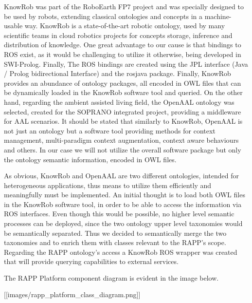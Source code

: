 Know\-Rob was part of the Robo\-Earth F\-P7 project and was specially designed to be used by robots, extending classical ontologies and concepts in a machine-\/usable way. Know\-Rob is a state-\/of-\/the-\/art robotic ontology, used by many scientific teams in cloud robotics projects for concepts storage, inference and distribution of knowledge. One great advantage to our cause is that bindings to R\-O\-S exist, as it would be challenging to utilize it otherwise, being developed in S\-W\-I-\/\-Prolog. Finally, The R\-O\-S bindings are created using the J\-P\-L interface (Java / Prolog bidirectional Interface) and the rosjava package. Finally, Know\-Rob provides an abundance of ontology packages, all encoded in O\-W\-L files that can be dynamically loaded in the Know\-Rob software tool and queried. On the other hand, regarding the ambient assisted living field, the Open\-A\-A\-L ontology was selected, created for the S\-O\-P\-R\-A\-N\-O integrated project, providing a middleware for A\-A\-L scenarios. It should be stated that similarly to Know\-Rob, Open\-A\-A\-L is not just an ontology but a software tool providing methods for context management, multi-\/paradigm context augmentation, context aware behaviours and others. In our case we will not utilize the overall software package but only the ontology semantic information, encoded in O\-W\-L files.

As obvious, Know\-Rob and Open\-A\-A\-L are two different ontologies, intended for heterogeneous applications, thus means to utilize them efficiently and meaningfully must be implemented. An initial thought is to load both O\-W\-L files in the Know\-Rob software tool, in order to be able to access the information via R\-O\-S interfaces. Even though this would be possible, no higher level semantic processes can be deployed, since the two ontology upper level taxonomies would be semantically separated. Thus we decided to semantically merge the two taxonomies and to enrich them with classes relevant to the R\-A\-P\-P’s scope. Regarding the R\-A\-P\-P ontology’s access a Know\-Rob R\-O\-S wrapper was created that will provide querying capabilities to external services.

The R\-A\-P\-P Platform component diagram is evident in the image below.

\mbox{[}\mbox{[}images/rapp\-\_\-platform\-\_\-class\-\_\-diagram.\-png\mbox{]}\mbox{]} 